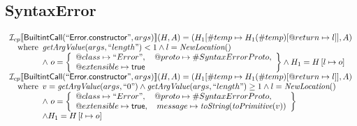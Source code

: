 \subsection{SyntaxError}
\[
\begin{array}{l}
\mathcal{I} _{cp}\llbracket \mbox{\textsf{BuiltintCall}}(``\mbox{\textsf{Error.constructor}}",args)\rrbracket(H,A)
  = (H_1[\#temp \mapsto H_1(\#temp)[@return \mapsto l]], A)\\
\quad{\rm where}\begin{array}[t]{l}
  \emph{getArgValue}(args, ``length") < 1 
  \land l=\emph{NewLocation}()\\
  \land\ o = \left\{\begin{array}{l}
    @class\mapsto ``Error", \quad
    @proto\mapsto \#SyntaxErrorProto,\\
    @extensible\mapsto \mbox{\textsf{true}}
    \end{array}\right\}
  \land H_1=H\left[l\mapsto o\right]\\
  \end{array}\\
  
\mathcal{I} _{cp}\llbracket \mbox{\textsf{BuiltintCall}}(``\mbox{\textsf{Error.constructor}}",args)\rrbracket(H,A)
  = (H_1[\#temp \mapsto H_1(\#temp)[@return \mapsto l]], A)\\
\quad{\rm where}\begin{array}[t]{l}
  v = \emph{getArgValue}(args, ``0") \land \emph{getArgValue}(args, ``length") \geq 1
  \land l=\emph{NewLocation}()\\
  \land\ o = \left\{\begin{array}{l}
    @class\mapsto ``Error", \quad
    @proto\mapsto \#SyntaxErrorProto,\\
    @extensible\mapsto \mbox{\textsf{true}},  \quad
    message \mapsto \emph{toString}(\emph{toPrimitive}(v)) 
    \end{array}\right\}\\
  \land H_1=H\left[l\mapsto o\right]
  \end{array}\\

\end{array}
\]


